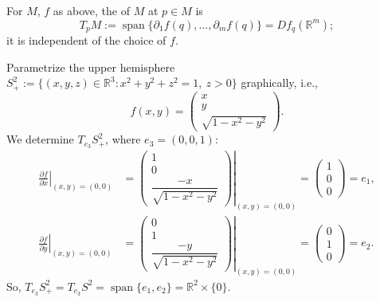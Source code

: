 \begin{definition}
\label{def:tangent_space}
For $M$, $f$ as above, the   of $M$ at
$p \in M$ is
\[T_pM := \operatorname{span}\{\partial_1f(q),\dots,\partial_mf(q)\} = Df_q(\mathbb{R}^m);\]
it is independent of the choice of $f$.
\end{definition}

\begin{example}
Parametrize the upper hemisphere $S^2_+ := \{(x,y,z)\in\mathbb{R}^3 : x^2+y^2+z^2=1,\ z>0\}$
graphically, i.e.,
\[f(x,y) = \begin{pmatrix} x \\ y \\ \sqrt{1-x^2-y^2} \end{pmatrix}.\]
We determine $T_{e_3}S^2_+$, where $e_3 = (0,0,1)$:
\begin{align*}
\left.\frac{\partial f}{\partial x}\right|_{(x,y)=(0,0)}
  &= \left.\begin{pmatrix} 1 \\ 0 \\ \dfrac{-x}{\sqrt{1-x^2-y^2}}\end{pmatrix}\right|_{(x,y)=(0,0)}
   = \begin{pmatrix}1\\0\\0\end{pmatrix} = e_1, \\[1ex]
\left.\frac{\partial f}{\partial y}\right|_{(x,y)=(0,0)}
  &= \left.\begin{pmatrix} 0 \\ 1 \\ \dfrac{-y}{\sqrt{1-x^2-y^2}}\end{pmatrix}\right|_{(x,y)=(0,0)}
   = \begin{pmatrix}0\\1\\0\end{pmatrix} = e_2.
\end{align*}
So, $T_{e_3}S^2_+ = T_{e_3}S^2 = \operatorname{span}\{e_1,e_2\} = \mathbb{R}^2\times\{0\}$.
\end{example}

